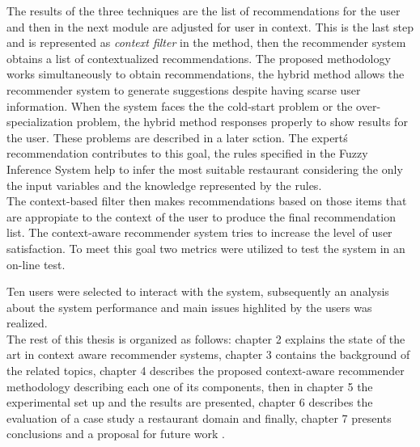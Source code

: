 The results of the three techniques are the list of
recommendations for the user and then in the next module are adjusted 
for user in context.
This is the last step and is represented as \textit{context filter} in
the method, then the recommender system obtains a list of
contextualized recommendations. The proposed methodology works
simultaneously to obtain recommendations, the hybrid method allows the
recommender system to generate suggestions despite having scarse
user information. When the system faces the the cold-start
problem or the over-specialization problem, the hybrid method
responses properly to show results for the user. These problems 
are described in a later sction. The expert\'s 
recommendation contributes to this goal, the rules specified in 
the Fuzzy Inference System help to infer the most suitable 
restaurant considering the only the input variables and the knowledge 
represented by the rules.\\
The context-based filter then makes recommendations based on those
items that are appropiate to the context of the user to produce
the final recommendation list. The context-aware recommender
system tries to increase the level of user satisfaction. To meet this
goal two metrics were utilized to test the system in an on-line test.



Ten users were selected to interact with the system, subsequently an
analysis about the system performance and main issues highlited by the
users was realized. \\

The rest of this thesis is organized as follows: chapter 2 explains
the state of the art in context aware recommender systems,  
chapter 3 contains the background of the related topics, 
chapter 4  describes the proposed context-aware recommender methodology
describing each one of its components, then in chapter 5 the experimental set up
and the results are presented, chapter 6 describes
the evaluation of a case study a restaurant domain and finally, chapter 7
presents conclusions and a proposal for future work .




